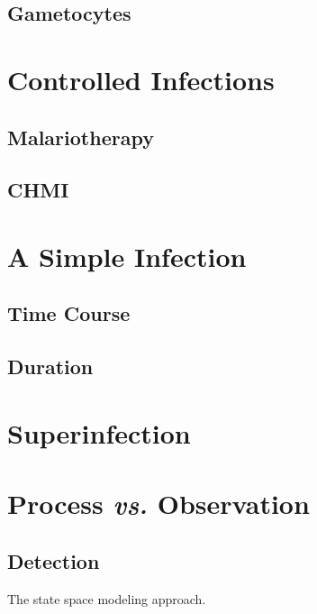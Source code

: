 \documentclass[
]{book}
\begin{document}
\subsection{Gametocytes}\label{gametocytes}

\section{Controlled Infections}\label{controlled-infections}

\subsection{Malariotherapy}\label{malariotherapy}

\subsection{CHMI}\label{chmi}

\section{A Simple Infection}\label{a-simple-infection}

\subsection{Time Course}\label{time-course}

\subsection{Duration}\label{duration}

\section{Superinfection}\label{superinfection-2}

\section{\texorpdfstring{Process \emph{vs.} Observation}{Process vs. Observation}}\label{process-vs.-observation}

\subsection{Detection}\label{detection}

The state space modeling approach.
\end{document}
